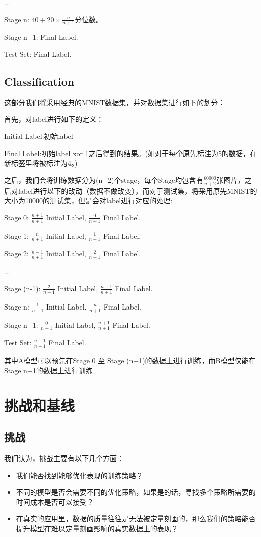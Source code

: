 \documentclass{article}
\begin{document}
...

Stage n: $40+20 \times \frac{n}{n+1}$分位数。

Stage n+1: Final Label.

Test Set: Final Label.

\subsection{Classification}
这部分我们将采用经典的MNIST数据集，并对数据集进行如下的划分：

首先，对label进行如下的定义：

Initial Label:初始label

Final Label:初始label xor 1之后得到的结果。(如对于每个原先标注为5的数据，在新标签里将被标注为4。)

之后，我们会将训练数据分为(n+2)个stage，每个Stage均包含有$\frac{60000}{n+2}$张图片，之后对label进行以下的改动（数据不做改变），而对于测试集，将采用原先MNIST的大小为10000的测试集，但是会对label进行对应的处理:

Stage 0: $\frac{n+1}{n+1}$ Initial Label, $\frac{0}{n+1}$ Final Label.

Stage 1: $\frac{n}{n+1}$ Initial Label, $\frac{1}{n+1}$ Final Label.

Stage 2: $\frac{n-1}{n+1}$ Initial Label, $\frac{2}{n+1}$ Final Label.

...

Stage (n-1): $\frac{2}{n+1}$ Initial Label, $\frac{n-1}{n+1}$ Final Label.

Stage n: $\frac{1}{n+1}$ Initial Label, $\frac{n}{n+1}$ Final Label.

Stage n+1: $\frac{0}{n+1}$ Initial Label, $\frac{n+1}{n+1}$ Final Label.

Test Set: $\frac{n+1}{n+1}$ Final Label.

其中A模型可以预先在Stage 0 至 Stage (n+1)的数据上进行训练，而B模型仅能在Stage n+1的数据上进行训练

\section{挑战和基线}

\subsection{挑战}

我们认为，挑战主要有以下几个方面：

\begin{itemize}
    \item 我们能否找到能够优化表现的训练策略？
    \item 不同的模型是否会需要不同的优化策略，如果是的话，寻找多个策略所需要的时间成本是否可以接受？
    \item 在真实的应用里，数据的质量往往是无法被定量刻画的，那么我们的策略能否提升模型在难以定量刻画影响的真实数据上的表现？
\end{itemize}
\end{document}
